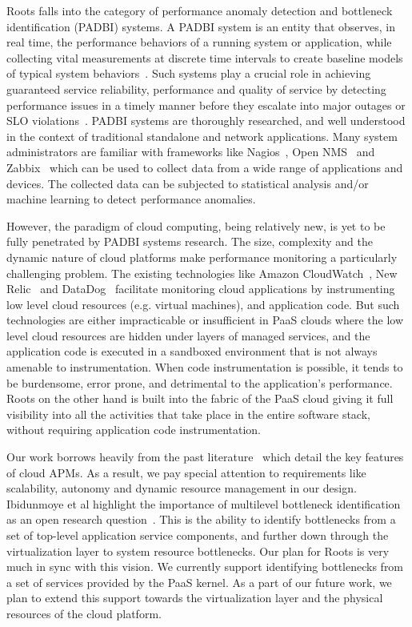 Roots falls into the category of performance anomaly detection and bottleneck identification (PADBI) systems.
A PADBI system is an entity that observes, in real time, the performance behaviors
of a running system or application, while collecting vital measurements at discrete time intervals to create baseline
models of typical system behaviors~\cite{Ibidunmoye:2015:PAD:2808687.2791120}. 
Such systems play a crucial role in achieving guaranteed service reliability, performance and
quality of service by detecting performance issues in a timely manner before they escalate into major outages
or SLO violations~\cite{6045942}. 
PADBI systems are thoroughly researched, and well understood in the context of traditional standalone and
network applications. Many system administrators are familiar with frameworks like 
Nagios~\cite{Harlan:2003:NMN:860375.860378}, Open NMS~\cite{opennms} and Zabbix~\cite{Tader:2010:SMZ:1883478.1883485} which
can be used to collect data from a wide range of applications and devices. The collected data can be
subjected to statistical analysis and/or machine learning to detect performance anomalies. 

However, the paradigm of cloud computing, being relatively new, is yet to be
fully penetrated by PADBI systems research. The size, complexity and the dynamic nature of 
cloud platforms make performance monitoring a particularly challenging problem.
The existing technologies like Amazon CloudWatch~\cite{cloudwatch},
New Relic~\cite{newrelic} and DataDog~\cite{datadog} facilitate monitoring cloud applications 
by instrumenting low level cloud resources (e.g. virtual machines), and application code. But such technologies
are either impracticable or insufficient in
PaaS clouds where the low level cloud resources are hidden under layers of managed
services, and the application code is executed in a sandboxed environment that is not
always amenable to instrumentation. When code instrumentation is possible, it tends to be
burdensome, error prone, and detrimental to the application's performance. Roots on the other hand is built into the 
fabric of the PaaS cloud giving it full visibility into all the activities that take place in the entire
software stack, without requiring application code instrumentation.

Our work borrows heavily from the past literature~\cite{DaCunhaRodrigues:2016:MCC:2851613.2851619,Ibidunmoye:2015:PAD:2808687.2791120} 
which detail the key features of cloud APMs. As a result, we pay special attention to requirements like
scalability, autonomy and dynamic resource management in our design.
Ibidunmoye et al highlight the importance of multilevel bottleneck identification as an open research
question~\cite{Ibidunmoye:2015:PAD:2808687.2791120}. This is the ability to
identify bottlenecks from a set of top-level application service components, and further down through the 
virtualization layer to system resource bottlenecks. Our plan for Roots is very much in sync with this
vision. We currently support identifying bottlenecks from a set of services provided by the PaaS kernel.
As a part of our future work, we plan to extend this support towards the virtualization layer and the
physical resources of the cloud platform.

